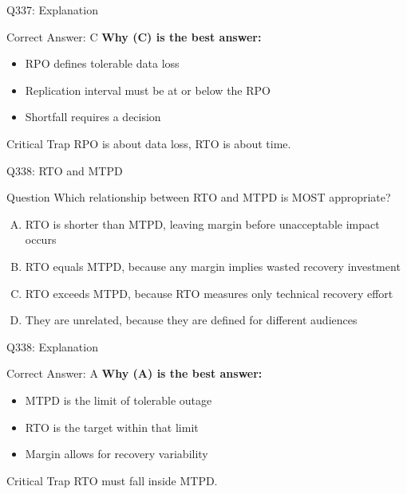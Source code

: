 \documentclass{beamer}
\begin{document}
	\begin{frame}{Q337: Explanation}
		\begin{block}{Correct Answer: C}
			\textbf{Why (C) is the best answer:}
			\begin{itemize}
				\item RPO defines tolerable data loss
				\item Replication interval must be at or below the RPO
				\item Shortfall requires a decision
			\end{itemize}
		\end{block}
		\begin{alertblock}{Critical Trap}
			RPO is about data loss, RTO is about time.
		\end{alertblock}
	\end{frame}
	
	\begin{frame}{Q338: RTO and MTPD}
		\begin{block}{Question}
			\small Which relationship between RTO and MTPD is MOST appropriate?
		\end{block}
		\begin{enumerate}[(A)]
			\footnotesize
			\item RTO is shorter than MTPD, leaving margin before unacceptable impact occurs
			\item RTO equals MTPD, because any margin implies wasted recovery investment
			\item RTO exceeds MTPD, because RTO measures only technical recovery effort
			\item They are unrelated, because they are defined for different audiences
		\end{enumerate}
	\end{frame}
	
	\begin{frame}{Q338: Explanation}
		\begin{block}{Correct Answer: A}
			\textbf{Why (A) is the best answer:}
			\begin{itemize}
				\item MTPD is the limit of tolerable outage
				\item RTO is the target within that limit
				\item Margin allows for recovery variability
			\end{itemize}
		\end{block}
		\begin{alertblock}{Critical Trap}
			RTO must fall inside MTPD.
		\end{alertblock}
	\end{frame}
	
\end{document}
